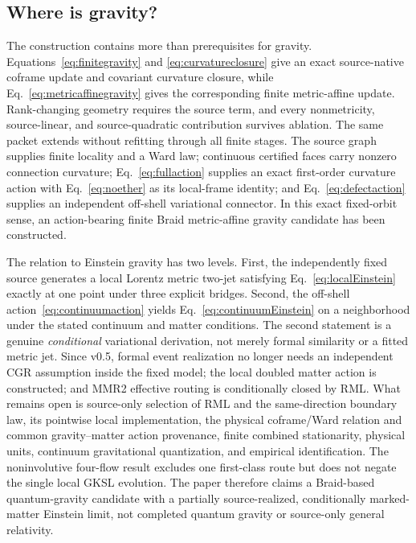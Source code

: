 \documentclass[11pt]{article}
\theoremstyle{definition}
\theoremstyle{remark}
\begin{document}
\subsection{Where is gravity?}

The construction contains more than prerequisites for gravity. Equations~\eqref{eq:finitegravity} and \eqref{eq:curvatureclosure} give an exact source-native coframe update and covariant curvature closure, while Eq.~\eqref{eq:metricaffinegravity} gives the corresponding finite metric-affine update. Rank-changing geometry requires the source term, and every nonmetricity, source-linear, and source-quadratic contribution survives ablation. The same packet extends without refitting through all finite stages. The source graph supplies finite locality and a Ward law; continuous certified faces carry nonzero connection curvature; Eq.~\eqref{eq:fullaction} supplies an exact first-order curvature action with Eq.~\eqref{eq:noether} as its local-frame identity; and Eq.~\eqref{eq:defectaction} supplies an independent off-shell variational connector. In this exact fixed-orbit sense, an action-bearing finite Braid metric-affine gravity candidate has been constructed.

The relation to Einstein gravity has two levels. First, the independently fixed source generates a local Lorentz metric two-jet satisfying Eq.~\eqref{eq:localEinstein} exactly at one point under three explicit bridges. Second, the off-shell action~\eqref{eq:continuumaction} yields Eq.~\eqref{eq:continuumEinstein} on a neighborhood under the stated continuum and matter conditions. The second statement is a genuine \emph{conditional} variational derivation, not merely formal similarity or a fitted metric jet. Since v0.5, formal event realization no longer needs an independent CGR assumption inside the fixed model; the local doubled matter action is constructed; and MMR2 effective routing is conditionally closed by RML. What remains open is source-only selection of RML and the same-direction boundary law, its pointwise local implementation, the physical coframe/Ward relation and common gravity--matter action provenance, finite combined stationarity, physical units, continuum gravitational quantization, and empirical identification. The noninvolutive four-flow result excludes one first-class route but does not negate the single local GKSL evolution. The paper therefore claims a Braid-based quantum-gravity candidate with a partially source-realized, conditionally marked-matter Einstein limit, not completed quantum gravity or source-only general relativity.
\end{document}
